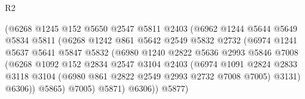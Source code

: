 \begin{lexlean}{R2}
\begin{coremodule}
                                  (@6268
                                    @1245
                                    @152
                                    @5650
                                    @2547
                                    @5811
                                    @2403
                                    (@6962
                                      @1244
                                      @5644
                                      @5649
                                      @5834
                                      @5811
                                      (@6268
                                        @1242
                                        @861
                                        @5642
                                        @2549
                                        @5832
                                        @2732
                                        (@6974
                                          @1241
                                          @5637
                                          @5641
                                          @5847
                                          @5832
                                          (@6980
                                            @1240
                                            @2822
                                            @5636
                                            @2993
                                            @5846
                                            @7008
                                            (@6268
                                              @1092
                                              @152
                                              @2834
                                              @2547
                                              @3104
                                              @2403
                                              (@6974
                                                @1091
                                                @2824
                                                @2833
                                                @3118
                                                @3104
                                                (@6980 @861 @2822 @2549 @2993 @2732 @7008 @7005)
                                                @3131)
                                              @6306))
                                          @5865)
                                        @7005)
                                      @5871)
                                    @6306))
                                @5877)

\end{coremodule}
\end{lexlean}

